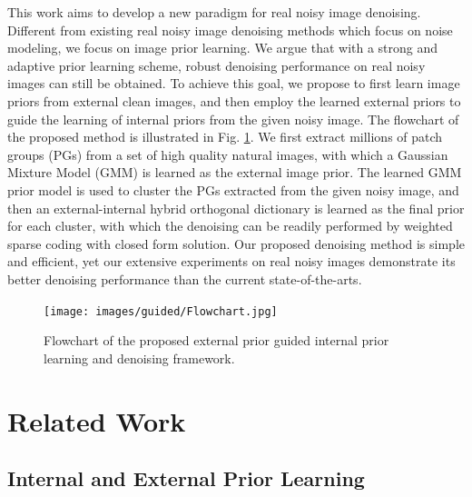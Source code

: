 This work aims to develop a new paradigm for real noisy image denoising. Different from existing real noisy image denoising methods \cite{fullyblind,rabie2005robust,Liu2008,almapg,crosschannel2016,Zhu_2016_CVPR,noiseclinic,ncwebsite}  which focus on noise modeling, we focus on image prior learning. We argue that with a strong and adaptive prior learning scheme, robust denoising performance on real noisy images can still be obtained.  To achieve this goal, we propose to first learn image priors from external clean images, and then employ the learned external priors to guide the learning of internal priors from the given noisy image. The flowchart of the proposed method is illustrated in Fig. \ref{fig3-2}. We first extract millions of patch groups (PGs) from a set of high quality natural images, with which a Gaussian Mixture Model (GMM) is learned as the external image prior. The learned GMM prior model is used to cluster the PGs extracted from the given noisy image, and then an external-internal hybrid orthogonal dictionary is learned as the final prior for each cluster, with which the denoising can be readily performed by weighted sparse coding with closed form solution. Our proposed denoising method is simple and efficient, yet our extensive experiments on real noisy images demonstrate its better denoising performance than the current state-of-the-arts.


\begin{figure}
\label{fig3-2}
\centering
\captionsetup{justification=centering,margin=0.1cm}
\texttt{[image: images/guided/Flowchart.jpg]}
\centering
\caption{Flowchart of the proposed external prior guided internal prior learning and denoising framework.}
\end{figure}



\section{Related Work}

\subsection{Internal and External Prior Learning}

